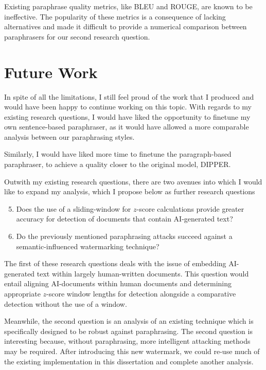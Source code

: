 \documentclass{l4proj}
\theoremstyle{definition}
\begin{document}
    Existing paraphrase quality metrics, like BLEU and ROUGE, are known to be ineffective. The popularity of these metrics is a consequence of lacking alternatives and made it difficult to provide a numerical comparison between paraphrasers for our second research question.
\section{Future Work}
    In spite of all the limitations, I still feel proud of the work that I produced and would have been happy to continue working on this topic. With regards to my existing research questions, I would have liked the opportunity to finetune my own sentence-based paraphraser, as it would have allowed a more comparable analysis between our paraphrasing styles.

    Similarly, I would have liked more time to finetune the paragraph-based paraphraser, to achieve a quality closer to the original model, DIPPER.
    
    Outwith my existing research questions, there are two avenues into which I would like to expand my analysis, which I propose below as further research questions
    \begin{enumerate}[label={\textbf{RQ\arabic*}:}, leftmargin=4em]
        \setcounter{enumi}{4}
        \item Does the use of a sliding-window for $z$-score calculations provide greater accuracy for detection of documents that contain AI-generated text? 
        \item Do the previously mentioned paraphrasing attacks succeed against a semantic-influenced watermarking technique?
    \end{enumerate}

    The first of these research questions deals with the issue of embedding AI-generated text within largely human-written documents. This question would entail aligning AI-documents within human documents and determining appropriate $z$-score window lengths for detection alongside a comparative detection without the use of a window.
    
    Meanwhile, the second question is an analysis of an existing technique which is specifically designed to be robust against paraphrasing. The second question is interesting because, without paraphrasing, more intelligent attacking methods may be required. After introducing this new watermark, we could re-use much of the existing implementation in this dissertation and complete another analysis. 
\end{document}
